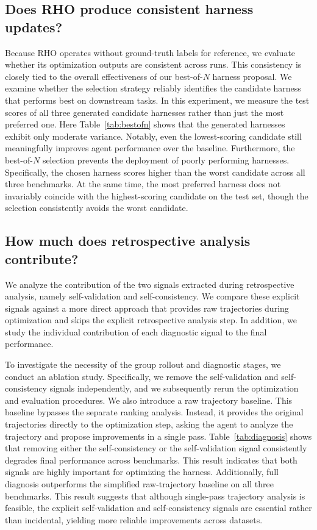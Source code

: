 \documentclass{llmxive}
\providecommand{\method}{\textsc{RHO}}
\begin{document}
\subsection{Does \method{} produce consistent harness updates?}
\label{sec:disc-consistency}

Because \method{} operates without ground-truth labels for reference, we evaluate whether its optimization outputs are consistent across runs.
This consistency is closely tied to the overall effectiveness of our best-of-$N$ harness proposal.
We examine whether the selection strategy reliably identifies the candidate harness that performs best on downstream tasks.
In this experiment, we measure the test scores of all three generated candidate harnesses rather than just the most preferred one.
Here Table~\ref{tab:bestofn} shows that the generated harnesses exhibit only moderate variance.
Notably, even the lowest-scoring candidate still meaningfully improves agent performance over the baseline.
Furthermore, the best-of-$N$ selection prevents the deployment of poorly performing harnesses.
Specifically, the chosen harness scores higher than the worst candidate across all three benchmarks.
At the same time, the most preferred harness does not invariably coincide with the highest-scoring candidate on the test set, though the selection consistently avoids the worst candidate.



\subsection{How much does retrospective analysis contribute?}
\label{sec:disc-diagnosis}

We analyze the contribution of the two signals extracted during retrospective analysis, namely self-validation and self-consistency.
We compare these explicit signals against a more direct approach that provides raw trajectories during optimization and skips the explicit retrospective analysis step.
In addition, we study the individual contribution of each diagnostic signal to the final performance.

To investigate the necessity of the group rollout and diagnostic stages, we conduct an ablation study.
Specifically, we remove the self-validation and self-consistency signals independently, and we subsequently rerun the optimization and evaluation procedures.
We also introduce a raw trajectory baseline.
This baseline bypasses the separate ranking analysis. Instead, it provides the original trajectories directly to the optimization step, asking the agent to analyze the trajectory and propose improvements in a single pass.
Table~\ref{tab:diagnosis} shows that removing either the self-consistency or the self-validation signal consistently degrades final performance across benchmarks.
This result indicates that both signals are highly important for optimizing the harness.
Additionally, full diagnosis outperforms the simplified raw-trajectory baseline on all three benchmarks.
This result suggests that although single-pass trajectory analysis is feasible, the explicit self-validation and self-consistency signals are essential rather than incidental, yielding more reliable improvements across datasets.
\end{document}
